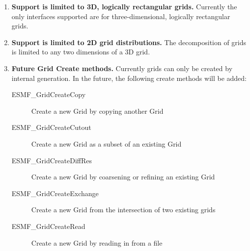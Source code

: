 

\begin{enumerate}

\item {\bf Support is limited to 3D, logically rectangular grids.} 
Currently the only interfaces supported are for three-dimensional, 
logically rectangular grids. 

\item {\bf Support is limited to 2D grid distributions.} The 
decomposition of grids is limited to any two dimensions of a 3D grid.

\item {\bf Future Grid Create methods.}  Currently grids can only
be created by internal generation.  In the future, the following
create methods will be added:
 \begin{description}
    \item [ESMF\_GridCreateCopy]
          Create a new Grid by copying another Grid
    \item [ESMF\_GridCreateCutout]
          Create a new Grid as a subset of an existing Grid
    \item [ESMF\_GridCreateDiffRes]
          Create a new Grid by coarsening or refining an existing Grid
    \item [ESMF\_GridCreateExchange]
          Create a new Grid from the intersection of two existing grids
    \item [ESMF\_GridCreateRead]
          Create a new Grid by reading in from a file
 \end{description}


\end{enumerate}
